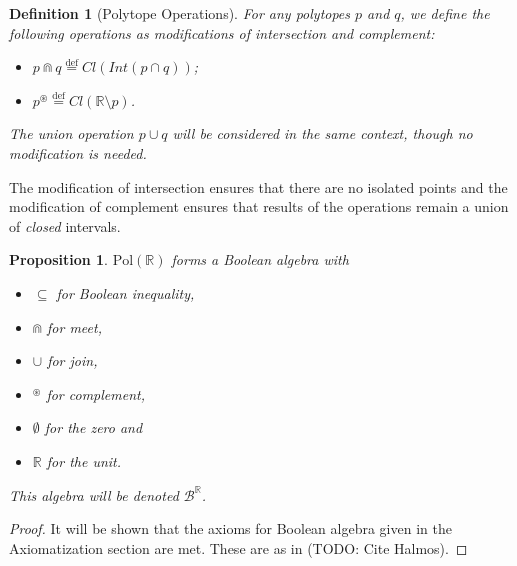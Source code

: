 \documentclass{article}
\newtheorem*{definition}{Definition}
\newtheorem*{proposition}{Proposition}
\newcommand{\R}{\mathbb{R}}
\newcommand{\B}{\mathcal{B}}
\newcommand{\bcup}{\cup}
\newcommand{\bcap}{\Cap}
\newcommand{\bstar}{^\circledast}
\newcommand{\Pol}{\text{Pol}}
\newcommand{\eqdef}{\stackrel{\text{def}}{=}}
\begin{document}
\begin{definition}[Polytope Operations]
For any polytopes $p$ and $q$, we define the following operations as modifications of intersection and complement:
\begin{itemize}
  \item $p \bcap q \eqdef Cl(Int(p \cap q))$;
  \item $p \bstar \eqdef Cl(\R \setminus p) $.
\end{itemize}
The union operation $p \bcup q$ will be considered in the same context, though no modification is needed.
\end{definition}

The modification of intersection ensures that there are no isolated points and the modification of complement ensures that results of the operations remain a union of \emph{closed} intervals.

\begin{proposition}
$\Pol(\R)$ forms a Boolean algebra with
  \begin{itemize}
  \item $\subseteq$ for Boolean inequality,
  \item $\bcap$ for meet,
  \item $\bcup$ for join,
  \item $\bstar$ for complement,
  \item $\emptyset$ for the zero and
  \item $\R$ for the unit.
\end{itemize}
This algebra will be denoted $\B^\R$.
\end{proposition}
\begin{proof}
  It will be shown that the axioms for Boolean algebra given in the Axiomatization section are met. These are as in (TODO: Cite Halmos).
\end{proof}
\end{document}
